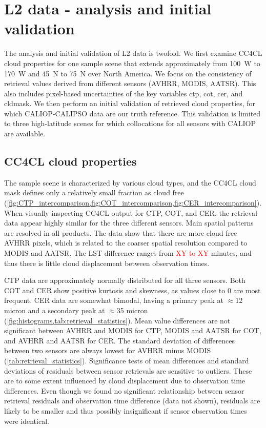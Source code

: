 \section{L2 data - analysis and initial validation}\label{L2_data}

The analysis and initial validation of L2 data is twofold. We first examine CC4CL cloud properties for one sample scene that extends approximately from 100\textdegree\ W to 170\textdegree\ W and 45\textdegree\ N to 75\textdegree\ N over North America. We focus on the consistency of retrieval values derived from different sensors (AVHRR, MODIS, AATSR). This also includes pixel-based uncertainties of the key variables ctp, cot, cer, and cldmask. We then perform an initial validation of retrieved cloud properties, for which CALIOP-CALIPSO data are our truth reference. This validation is limited to three high-latitude scenes for which collocations for all sensors with CALIOP are available.

\subsection{CC4CL cloud properties}

The sample scene is characterized by various cloud types, and the CC4CL cloud mask defines only a relatively small fraction as cloud free (\cref{fig:CTP_intercomparison,fig:COT_intercomparison,fig:CER_intercomparison}). When visually inspecting CC4CL output for CTP, COT, and CER, the retrieval data appear highly similar for the three different sensors. Main spatial patterns are resolved in all products. The data show that there are more cloud free AVHRR pixels, which is related to the coarser spatial resolution compared to MODIS and AATSR. The LST difference ranges from \textcolor{red}{XY to XY} minutes, and thus there is little cloud displacement between observation times.

CTP data are approximately normally distributed for all three sensors. Both COT and CER show positive kurtosis and skewness, as values close to 0 are most frequent. CER data are somewhat bimodal, having a primary peak at $\approx$12 micron and a secondary peak at $\approx$35 micron (\cref{fig:histograms,tab:retrieval_statistics}). Mean value differences are not significant between AVHRR and MODIS for CTP, MODIS and AATSR for COT, and AVHRR and AATSR for CER. The standard deviation of differences between two sensors are always lowest for AVHRR minus MODIS (\cref{tab:retrieval_statistics}). Significance tests of mean differences and standard deviations of residuals between sensor retrievals are sensitive to outliers. These are to some extent influenced by cloud displacement due to observation time differences. Even though we found no significant relationship between sensor retrieval residuals and observation time difference (data not shown), residuals are likely to be smaller and thus possibly insignificant if sensor observation times were identical.


